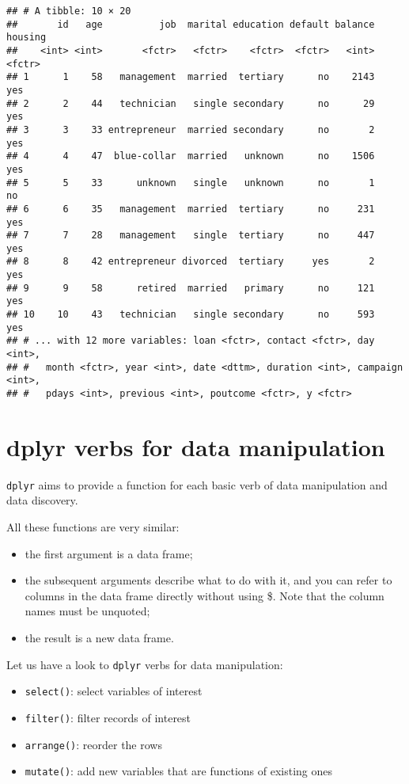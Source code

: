\documentclass[]{book}
\providecommand{\tightlist}{%
  \setlength{\itemsep}{0pt}\setlength{\parskip}{0pt}}
\def\tightlist{}
\begin{document}
\begin{verbatim}
## # A tibble: 10 × 20
##       id   age          job  marital education default balance housing
##    <int> <int>       <fctr>   <fctr>    <fctr>  <fctr>   <int>  <fctr>
## 1      1    58   management  married  tertiary      no    2143     yes
## 2      2    44   technician   single secondary      no      29     yes
## 3      3    33 entrepreneur  married secondary      no       2     yes
## 4      4    47  blue-collar  married   unknown      no    1506     yes
## 5      5    33      unknown   single   unknown      no       1      no
## 6      6    35   management  married  tertiary      no     231     yes
## 7      7    28   management   single  tertiary      no     447     yes
## 8      8    42 entrepreneur divorced  tertiary     yes       2     yes
## 9      9    58      retired  married   primary      no     121     yes
## 10    10    43   technician   single secondary      no     593     yes
## # ... with 12 more variables: loan <fctr>, contact <fctr>, day <int>,
## #   month <fctr>, year <int>, date <dttm>, duration <int>, campaign <int>,
## #   pdays <int>, previous <int>, poutcome <fctr>, y <fctr>
\end{verbatim}

\clearpage

\section{dplyr verbs for data
manipulation}\label{dplyr-verbs-for-data-manipulation}

\texttt{dplyr} aims to provide a function for each basic verb of data
manipulation and data discovery.

All these functions are very similar:

\begin{itemize}
\tightlist
\item
  the first argument is a data frame;
\item
  the subsequent arguments describe what to do with it, and you can
  refer to columns in the data frame directly without using \$. Note
  that the column names must be unquoted;
\item
  the result is a new data frame.
\end{itemize}

Let us have a look to \texttt{dplyr} verbs for data manipulation:

\begin{itemize}
\tightlist
\item
  \texttt{select()}: select variables of interest
\item
  \texttt{filter()}: filter records of interest
\item
  \texttt{arrange()}: reorder the rows
\item
  \texttt{mutate()}: add new variables that are functions of existing
  ones
\end{itemize}
\end{document}
